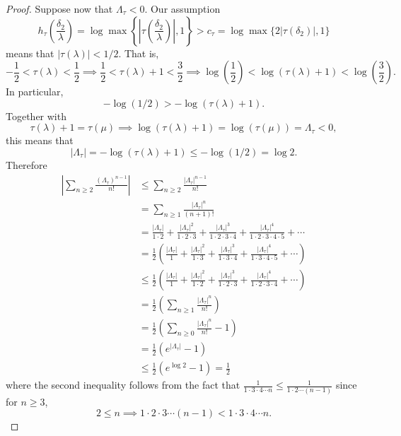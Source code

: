 \begin{proof}
Suppose now that $\Lambda_\tau<0$. Our assumption 
\[ h_{\tau}\left(\frac{\delta_2}{\lambda}\right) = \log \max \left\{ \left|\tau\left(\frac{\delta_2}{\lambda}\right)\right|, 1\right\} > c_\tau = \log \max\{2|\tau(\delta_2)|,1\}\]
means that $|\tau(\lambda)| < 1/2$. 
That is, 
\[-\frac{1}{2} < \tau(\lambda) < \frac{1}{2} \implies \frac{1}{2} < \tau(\lambda) + 1 < \frac{3}{2} \implies \log\left(\frac{1}{2}\right) < \log(\tau(\lambda) + 1) < \log\left(\frac{3}{2}\right).\]
In particular, 
\[-\log\left(1/2\right) > -\log(\tau(\lambda) + 1).\]
Together with 
\[\tau(\lambda) + 1 = \tau(\mu) \implies \log(\tau(\lambda) + 1)= \log(\tau(\mu)) = \Lambda_{\tau} < 0,\]
this means that
\[|\Lambda_\tau|=-\log (\tau(\lambda)+1)\leq -\log(1/2)=\log 2.\]
Therefore
\begin{align*}
\left| \sum_{n\geq 2} \frac{(\Lambda_\tau)^{n-1}}{n!}\right| 
	& \leq \sum_{n\geq 2} \frac{|\Lambda_\tau|^{n-1}}{n!}\\	
	& =\sum_{n\geq 1} \frac{|\Lambda_\tau|^{n}}{(n+1)!}\\
	& = \frac{|\Lambda_\tau|}{1\cdot 2}+ \frac{|\Lambda_\tau|^{2}}{1\cdot 2\cdot 3}+\frac{|\Lambda_\tau|^{3}}{1\cdot 2\cdot 3\cdot 4} + \frac{|\Lambda_\tau|^{4}}{1\cdot 2\cdot 3\cdot 4\cdot 5} + \cdots\\
	& = \frac{1}{2} \left(\frac{|\Lambda_\tau|}{1}+ \frac{|\Lambda_\tau|^{2}}{1\cdot 3}+\frac{|\Lambda_\tau|^{3}}{1\cdot 3\cdot 4} + \frac{|\Lambda_\tau|^{4}}{1\cdot 3\cdot 4\cdot 5} + \cdots\right)\\
	& \leq \frac{1}{2} \left(\frac{|\Lambda_\tau|}{1}+ \frac{|\Lambda_\tau|^{2}}{1\cdot 2}+\frac{|\Lambda_\tau|^{3}}{1\cdot 2\cdot 3} + \frac{|\Lambda_\tau|^{4}}{1\cdot 2\cdot 3\cdot 4} + \cdots\right)\\
	&= \frac{1}{2} \left(\sum_{n \geq 1} \frac{|\Lambda_{\tau}|^n}{n!}\right)\\
	&= \frac{1}{2} \left(\sum_{n \geq 0} \frac{|\Lambda_{\tau}|^n}{n!} - 1\right)\\
	&= \frac{1}{2} (e^{|\Lambda_{\tau}|} - 1)\\
	& \leq \frac{1}{2} (e^{\log{2}} - 1) = \frac{1}{2}
\end{align*}
where the second inequality follows from the fact that $\frac{1}{1\cdot 3 \cdot 4 \cdots n} \leq \frac{1}{1\cdot 2\cdots (n-1)}$ since for $n \geq 3$,  
\[2 \leq n \implies 1\cdot 2 \cdot 3 \cdots (n-1) < 1\cdot 3 \cdot 4\cdots n.\]


\end{proof}
